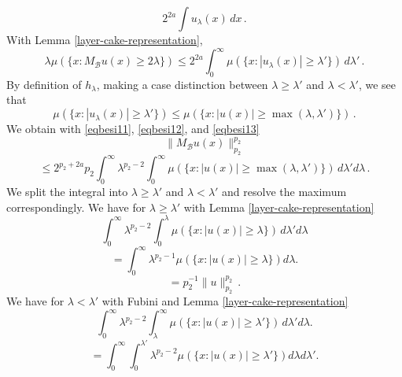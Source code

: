 {\begin{equation}
   2^{2a}
    \int u_\lambda (x)\, dx\, .
\end{equation}
With Lemma \ref{layer-cake-representation},
\begin{equation}\label{eqbesi12}
    \lambda \mu(\{x: M_{\mathcal{B}}u(x)\ge 2\lambda\})\le
   2^{2a}
    \int_0^\infty  \mu (\{x: |u_\lambda (x)|\ge \lambda'\})\, d\lambda'\, .
\end{equation}
By definition of $h_\lambda$, making a case distinction between $\lambda\ge \lambda'$ and $\lambda <\lambda'$, we see that
\begin{equation}\label{eqbesi13}
   \mu (\{x: |u_\lambda (x)|\ge \lambda'\})
   \le
   \mu (\{x: |u (x)|\ge \max(\lambda,\lambda')\})\, .
\end{equation}
We obtain with \eqref{eqbesi11},
\eqref{eqbesi12}, and \eqref{eqbesi13}
\begin{equation}
    \|M_{\mathcal{B}}u(x)\|_{p_2}^{p_2}
 \end{equation}
 \begin{equation}
   \le 2^{p_2+2a} p_2
   \int_0^\infty \lambda^{p_2-2}
   \int_0^\infty
   \mu (\{x: |u (x)|\ge \max(\lambda,\lambda')\})
   \, d\lambda'd\lambda\, .
\end{equation}
We split the integral  into $\lambda\ge \lambda'$ and $\lambda<\lambda'$ and resolve the
maximum correspondingly.
We have for $\lambda\ge \lambda'$
with Lemma \ref{layer-cake-representation}
\begin{equation}
    \int_0^\infty \lambda^{p_2-2}
   \int_0^\lambda
   \mu (\{x: |u (x)|\ge \lambda\})
   \, d\lambda'd\lambda
\end{equation}
\begin{equation}
   =\int_0^\infty \lambda^{p_2-1}
     \mu (\{x: |u (x)|\ge \lambda\})
d\lambda.
\end{equation}
\begin{equation}\label{eqbesi14}
   =p_2^{-1} \|u\|_{p_2}^{p_2}\, .
\end{equation}
We have for $\lambda< \lambda'$
with Fubini and Lemma \ref{layer-cake-representation}
\begin{equation}
    \int_0^\infty \lambda^{p_2-2}
   \int_\lambda^\infty
   \mu (\{x: |u(x)|\ge \lambda'\})
   \, d\lambda'd\lambda.
\end{equation}
\begin{equation}
   =\int_0^\infty \int_0^{\lambda'}\lambda^{p_2-2}
     \mu (\{x: |u (x)|\ge \lambda'\})
d\lambda d\lambda'.
\end{equation}
\begin{equation}

\end{equation}}
